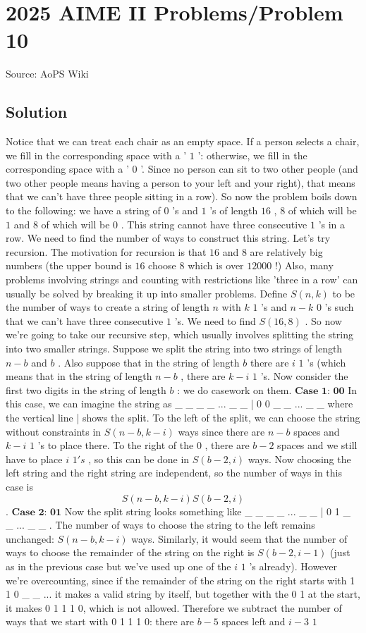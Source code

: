 \documentclass[12pt]{article}
\begin{document}
\section*{{2025 AIME II Problems/Problem 10}}
Source: AoPS Wiki

\subsection*{Solution}
Notice that we can treat each chair as an empty space. If a person selects a chair, we fill in the corresponding space with a ' $1$ ': otherwise, we fill in the corresponding space with a ' $0$ '. Since no person can sit to two other people (and two other people means having a person to your left and your right), that means that we can't have three people sitting in a row). So now the problem boils down to the following: we have a string of $0$ 's and $1$ 's of length $16$ , $8$ of which will be $1$ and $8$ of which will be $0$ . This string cannot have three consecutive $1$ 's in a row. We need to find the number of ways to construct this string. Let's try recursion. The motivation for recursion is that $16$ and $8$ are relatively big numbers (the upper bound is $16$ choose $8$ which is over $12000$ !) Also, many problems involving strings and counting with restrictions like 'three in a row' can usually be solved by breaking it up into smaller problems. Define $S(n,k)$ to be the number of ways to create a string of length $n$ with $k$ $1$ 's and $n-k$ $0$ 's such that we can't have three consecutive $1$ 's. We need to find $S(16,8)$ . So now we're going to take our recursive step, which usually involves splitting the string into two smaller strings. Suppose we split the string into two strings of length $n-b$ and $b$ . Also suppose that in the string of length $b$ there are $i$ $1$ 's (which means that in the string of length $n-b$ , there are $k-i$ $1$ 's. Now consider the first two digits in the string of length $b$ : we do casework on them. $\textbf{Case 1: 00}$ In this case, we can imagine the string as _ _ _ _ ... _ _ | 0 0 _ _ ... _ _ where the vertical line | shows the split. To the left of the split, we can choose the string without constraints in $S(n-b, k-i)$ ways since there are $n-b$ spaces and $k-i$ $1$ 's to place there. To the right of the $0$ , there are $b-2$ spaces and we still have to place $i$ $1's$ , so this can be done in $S(b-2,i)$ ways. Now choosing the left string and the right string are independent, so the number of ways in this case is \[S(n-b, k-i)S(b-2, i)\] . $\textbf{Case 2: 01}$ Now the split string looks something like _ _ _ _ ... _ _ | 0 1 _ _ ... _ _ . The number of ways to choose the string to the left remains unchanged: $S(n-b, k-i)$ ways. Similarly, it would seem that the number of ways to choose the remainder of the string on the right is $S(b-2, i-1)$ (just as in the previous case but we've used up one of the $i$ $1$ 's already). However we're overcounting, since if the remainder of the string on the right starts with 1 1 0 _ _ ... it makes a valid string by itself, but together with the 0 1 at the start, it makes 0 1 1 1 0, which is not allowed. Therefore we subtract the number of ways that we start with 0 1 1 1 0: there are $b-5$ spaces left and $i-3$ $1$ 
\end{document}

